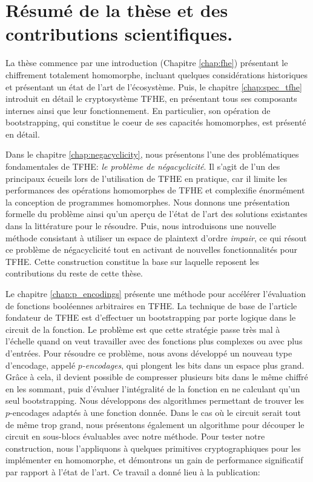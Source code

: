 \section*{Résumé de la thèse et des contributions scientifiques.}

La thèse commence par une introduction (Chapitre \ref{chap:fhe}) présentant le chiffrement totalement homomorphe, incluant quelques considérations historiques et présentant un état de l’art de l'écosystème. Puis, le chapitre \ref{chap:spec_tfhe} introduit en détail le cryptosystème \gls{TFHE}, en présentant tous ses composants internes ainsi que leur fonctionnement. En particulier, son opération de bootstrapping, qui constitue le coeur de ses capacités homomorphes, est présenté en détail.


Dans le chapitre \ref{chap:negacyclicity}, nous présentons l'une des problématiques fondamentales de \gls{TFHE}: \textit{le problème de négacyclicité}. Il s'agit de l’un des principaux écueils lors de l'utilisation de \gls{TFHE} en pratique,  car il limite les performances des opérations homomorphes de \gls{TFHE} et complexifie énormément la conception de programmes homomorphes. Nous donnons une présentation formelle du problème ainsi qu’un aperçu de l’état de l’art des solutions existantes dans la littérature pour le résoudre. Puis, nous introduisons une nouvelle méthode consistant à utiliser un espace de plaintext d'ordre \textit{impair}, ce qui résout ce problème de négacyclicité tout en activant de nouvelles fonctionnalités pour \gls{TFHE}. Cette construction constitue la base sur laquelle reposent les contributions du reste de cette thèse.


Le chapitre \ref{chap:p_encodings} présente une méthode pour accélérer l’évaluation de fonctions booléennes arbitraires en \gls{TFHE}. La technique de base de l'article fondateur de \gls{TFHE} est d'effectuer un bootstrapping par porte logique dans le circuit de la fonction. Le problème est que cette stratégie passe très mal à l'échelle quand on veut travailler avec des fonctions plus complexes ou avec plus d'entrées. Pour résoudre ce problème, nous avons développé un nouveau type d'encodage, appelé \textit{$p$-encodages}, qui plongent les bits dans un espace plus grand. Grâce à cela, il devient possible de compresser plusieurs bits dans le même chiffré en les sommant, puis d'évaluer l'intégralité de la fonction en ne calculant qu'un seul bootstrapping. Nous développons des algorithmes permettant de trouver les $p$-encodages adaptés à une fonction donnée. Dans le cas où le circuit serait tout de même trop grand, nous présentons également un algorithme pour découper le circuit en sous-blocs évaluables avec notre méthode. Pour tester notre construction, nous l'appliquons à quelques primitives cryptographiques pour les implémenter en homomorphe, et démontrons un gain de performance significatif par rapport à l’état de l’art.
Ce travail a donné lieu à la publication:

